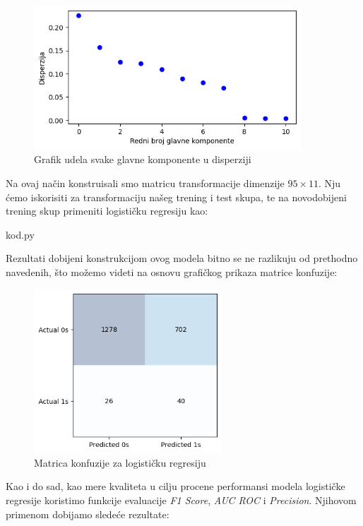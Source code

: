 \documentclass[12pt]{article}
\theoremstyle{definition}
\theoremstyle{remark}
\begin{document}
\begin{figure}[htp]
    \centering
    \includegraphics[width=10cm]{output_33_0.png}
    \caption{Grafik udela svake glavne komponente u disperziji}
    \label{fig:galaxy}
\end{figure}

Na ovaj način konstruisali smo matricu transformacije dimenzije $95\times 11$. Nju ćemo iskorisiti za transformaciju našeg trening i test skupa, te na novodobijeni trening skup primeniti logističku regresiju kao:


\hfill


{kod.py}

\hfill


Rezultati dobijeni konstrukcijom ovog modela bitno se ne razlikuju od prethodno navedenih, što možemo videti na osnovu grafičkog prikaza matrice konfuzije:

\begin{figure}[htp]
    \centering
    \includegraphics[width=7cm]{output_35_0.png}
    \caption{Matrica konfuzije za logističku regresiju}
    \label{fig:galaxy}
\end{figure}

Kao i do sad, kao mere kvaliteta u cilju procene performansi modela logističke regresije koristimo funkcije evaluacije  \emph{F1 Score}, \emph{AUC ROC} i \emph{Precision}. Njihovom primenom dobijamo sledeće rezultate:
\end{document}
